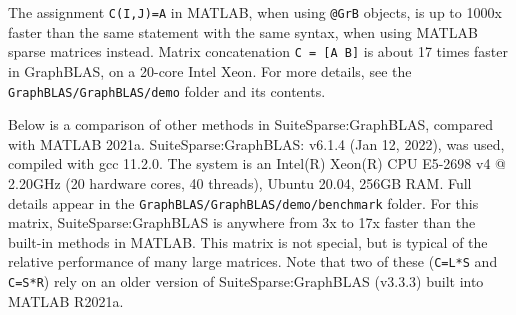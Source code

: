 \documentclass[12pt]{article}
\begin{document}
The assignment \verb'C(I,J)=A' in MATLAB, when using \verb'@GrB' objects, is up
to 1000x faster than the same statement with the same syntax, when using MATLAB
sparse matrices instead.  Matrix concatenation \verb'C = [A B]' is about 17
times faster in GraphBLAS, on a 20-core Intel Xeon.  For more details, see the
\verb'GraphBLAS/GraphBLAS/demo' folder and its contents.

Below is a comparison of other methods in SuiteSparse:GraphBLAS, compared with
MATLAB 2021a.  SuiteSparse:GraphBLAS: v6.1.4 (Jan 12, 2022), was used, compiled
with gcc 11.2.0.  The system is an Intel(R) Xeon(R) CPU E5-2698 v4 @ 2.20GHz
(20 hardware cores, 40 threads), Ubuntu 20.04, 256GB RAM.  Full details appear
in the \verb'GraphBLAS/GraphBLAS/demo/benchmark' folder.  For this matrix,
SuiteSparse:GraphBLAS is anywhere from 3x to 17x faster than the built-in
methods in MATLAB.  This matrix is not special, but is typical of the relative
performance of many large matrices.  Note that two of these (\verb'C=L*S' and
\verb'C=S*R') rely on an older version of SuiteSparse:GraphBLAS (v3.3.3) built
into MATLAB R2021a.
\end{document}
